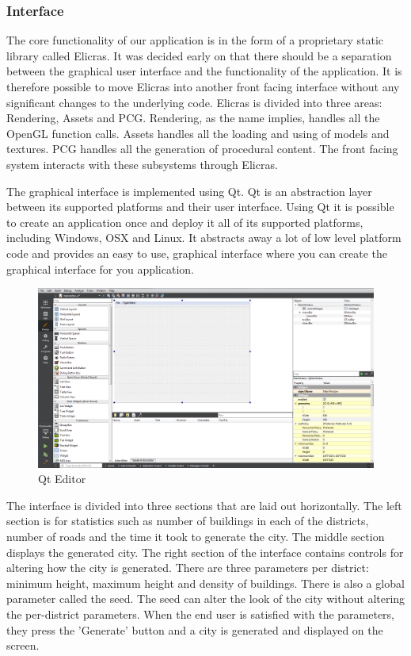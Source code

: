 		\subsubsection{Interface}
		The core functionality of our application is in the form of a proprietary static library called Elicras. It was decided early on that there should be a separation between the graphical user interface and the functionality of the application. It is therefore possible to move Elicras into another front facing interface without any significant changes to the underlying code. Elicras is divided into three areas: Rendering, Assets and PCG. Rendering, as the name implies, handles all the OpenGL function calls. Assets handles all the loading and using of models and textures. PCG handles all the generation of procedural content. The front facing system interacts with these subsystems through Elicras.
		
		\par
		The graphical interface is implemented using Qt\cite{QtWebpage}. Qt is an abstraction layer between its supported platforms and their user interface. Using Qt it is possible to create an application once and deploy it all of its supported platforms, including Windows, OSX and Linux. It abstracts away a lot of low level platform code and provides an easy to use, graphical interface where you can create the graphical interface for you application\cite{Win32Programming}\cite{QtProgramming}.
		
		\begin{figure}
			\centering
			\includegraphics[width=0.9\linewidth]{"Images/Qt"}
			\caption{Qt Editor}
			\label{fig:qt-editor}
		\end{figure}
		
		\par
		The interface is divided into three sections that are laid out horizontally. The left section is for statistics such as number of buildings in each of the districts, number of roads and the time it took to generate the city. The middle section displays the generated city. The right section of the interface contains controls for altering how the city is generated. There are three parameters per district: minimum height, maximum height and density of buildings. There is also a global parameter called the seed. The seed can alter the look of the city without altering the per-district parameters. When the end user is satisfied with the parameters, they press the 'Generate' button and a city is generated and displayed on the screen.
		
